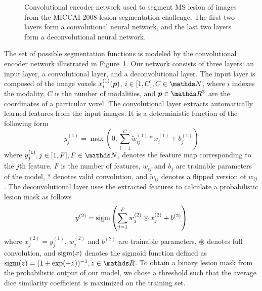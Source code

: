\begin{figure}[tb]
\centering

\caption{Convolutional encoder network used to segment MS lesion of images from
the MICCAI 2008 lesion segmentation challenge. The first two layers form a
convolutional neural network, and the last two layers form a deconvolutional
neural network.}
\label{fig:network}
\end{figure}

The set of possible segmentation functions is modeled by the convolutional
encoder network illustrated in Figure~\ref{fig:network}. Our network consists of
three layers: an input layer, a convolutional layer, and a deconvolutional
layer. The input layer is composed of the image voxels $x^{(1)}_i(\vect{p})$, $i
\in [1, C], C \in \N$, where $i$ indexes the modality, $C$ is the number of
modalities, and $\vect{p} \in \R^3$ are the coordinates of a particular voxel.
The convolutional layer extracts automatically learned features from the input
images. It is a deterministic function of the following form
\begin{equation}
y^{(1)}_j = \max \left(0, \sum_{i=1}^{C}\tilde{w}^{(1)}_{ij}*x^{(1)}_i +
b^{(1)}_j\right)
\end{equation} 
where $y^{(1)}_j, j \in [1, F], F \in \N$, denotes the feature map corresponding
to the $j$th feature, $F$ is the number of features, $w_{ij}$ and $b_j$
are trainable parameters of the model, $*$ denotes valid convolution, and
$\tilde{w}_{ij}$ denotes a flipped version of $w_{ij}$. The deconvolutional
layer uses the extracted features to calculate a probabilistic lesion mask as
follows
\begin{equation}
y^{(2)} = \operatorname{sigm}\left(\sum_{j=1}^Fw^{(2)}_{j}\circledast x^{(2)}_j +
b^{(2)}\right)
\end{equation}
where $x^{(2)}_j = y^{(1)}_j$, $w^{(2)}_j$ and $b^{(2)}$ are trainable
parameters, $\circledast$ denotes full convolution, and $\operatorname{sigm}(x)$ denotes the
sigmoid function defined as $\sigm(z) = (1 + \exp(-z))^{-1}, z \in \R$. To
obtain a binary lesion mask from the probabilistic output of our model, we chose
a threshold such that the average dice similarity coefficient is maximized on
the training set.

